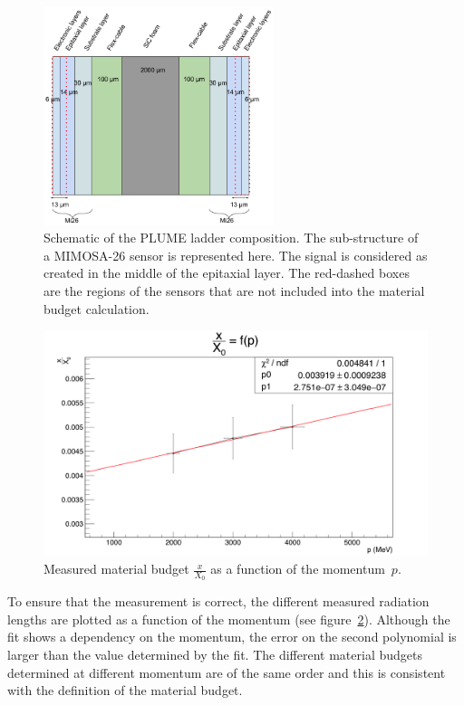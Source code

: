    \begin{figure}[!tbh]
     \centering
     \includegraphics[width = 0.6\textwidth]{Pictures/X0/SignalReconstructionMi26.png}
     \caption{Schematic of the PLUME ladder composition. The sub-structure of a MIMOSA-26 sensor is represented here. The signal is considered as created in the middle of the epitaxial layer.
     The red-dashed boxes are the regions of the sensors that are not included into the material budget calculation.}
     \label{fig:signalReconstruction}
   \end{figure}
   

   
   \begin{figure}[!tbh]
     \centering
     \includegraphics[width =\textwidth]{Pictures/X0/radiationLength_2-4GeV.png}
     \caption{Measured material budget $\frac{x}{X_0}$ as a function of the momentum~$p$.}
     \label{fig:X0vsP}
   \end{figure}


   To ensure that the measurement is correct, the different measured radiation lengths are plotted as a function of the momentum (see figure~\ref{fig:X0vsP}).
   Although the fit shows a dependency on the momentum, the error on the second polynomial is larger than the value determined by the fit.
   The different material budgets determined at different momentum are of the same order and this is consistent with the definition of the material budget.

